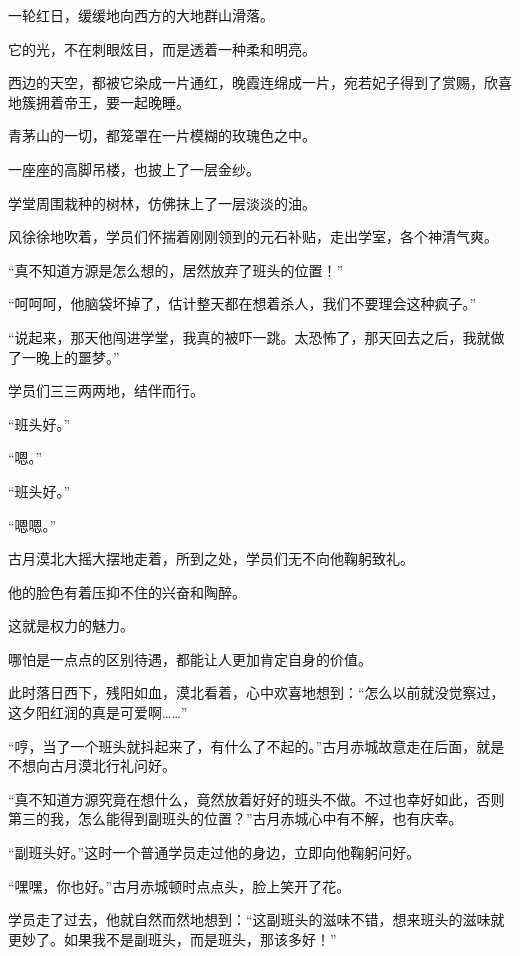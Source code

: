 
\begin{this_body}

一轮红日，缓缓地向西方的大地群山滑落。

它的光，不在刺眼炫目，而是透着一种柔和明亮。

西边的天空，都被它染成一片通红，晚霞连绵成一片，宛若妃子得到了赏赐，欣喜地簇拥着帝王，要一起晚睡。

青茅山的一切，都笼罩在一片模糊的玫瑰色之中。

一座座的高脚吊楼，也披上了一层金纱。

学堂周围栽种的树林，仿佛抹上了一层淡淡的油。

风徐徐地吹着，学员们怀揣着刚刚领到的元石补贴，走出学室，各个神清气爽。

“真不知道方源是怎么想的，居然放弃了班头的位置！”

“呵呵呵，他脑袋坏掉了，估计整天都在想着杀人，我们不要理会这种疯子。”

“说起来，那天他闯进学堂，我真的被吓一跳。太恐怖了，那天回去之后，我就做了一晚上的噩梦。”

学员们三三两两地，结伴而行。

“班头好。”

“嗯。”

“班头好。”

“嗯嗯。”

古月漠北大摇大摆地走着，所到之处，学员们无不向他鞠躬致礼。

他的脸色有着压抑不住的兴奋和陶醉。

这就是权力的魅力。

哪怕是一点点的区别待遇，都能让人更加肯定自身的价值。

此时落日西下，残阳如血，漠北看着，心中欢喜地想到：“怎么以前就没觉察过，这夕阳红润的真是可爱啊……”

“哼，当了一个班头就抖起来了，有什么了不起的。”古月赤城故意走在后面，就是不想向古月漠北行礼问好。

“真不知道方源究竟在想什么，竟然放着好好的班头不做。不过也幸好如此，否则第三的我，怎么能得到副班头的位置？”古月赤城心中有不解，也有庆幸。

“副班头好。”这时一个普通学员走过他的身边，立即向他鞠躬问好。

“嘿嘿，你也好。”古月赤城顿时点点头，脸上笑开了花。

学员走了过去，他就自然而然地想到：“这副班头的滋味不错，想来班头的滋味就更妙了。如果我不是副班头，而是班头，那该多好！”


\end{this_body}
